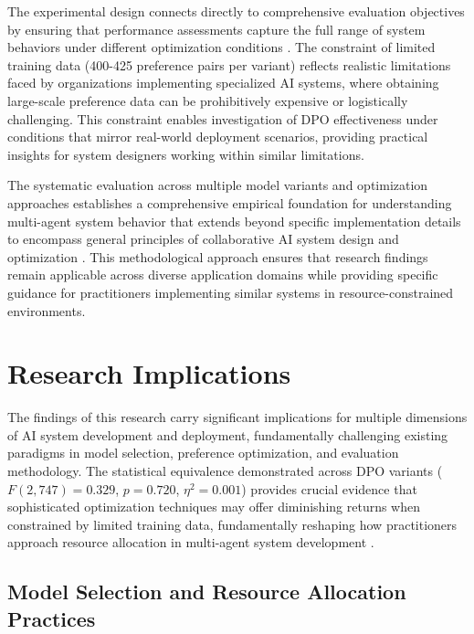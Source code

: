 The experimental design connects directly to comprehensive evaluation objectives by ensuring that performance assessments capture the full range of system behaviors under different optimization conditions \cite{card2020statistical_power, connolly2023task_specific}. The constraint of limited training data (400-425 preference pairs per variant) reflects realistic limitations faced by organizations implementing specialized AI systems, where obtaining large-scale preference data can be prohibitively expensive or logistically challenging. This constraint enables investigation of DPO effectiveness under conditions that mirror real-world deployment scenarios, providing practical insights for system designers working within similar limitations.

The systematic evaluation across multiple model variants and optimization approaches establishes a comprehensive empirical foundation for understanding multi-agent system behavior that extends beyond specific implementation details to encompass general principles of collaborative AI system design and optimization \cite{kim2025pipa_evaluation, siegel2024core_bench}. This methodological approach ensures that research findings remain applicable across diverse application domains while providing specific guidance for practitioners implementing similar systems in resource-constrained environments.

\section{Research Implications}

The findings of this research carry significant implications for multiple dimensions of AI system development and deployment, fundamentally challenging existing paradigms in model selection, preference optimization, and evaluation methodology. The statistical equivalence demonstrated across DPO variants ($F(2,747) = 0.329$, $p = 0.720$, $\eta^2 = 0.001$) provides crucial evidence that sophisticated optimization techniques may offer diminishing returns when constrained by limited training data, fundamentally reshaping how practitioners approach resource allocation in multi-agent system development \cite{deng2025preference_data_selection, feng2024dpo_limitations}.

\subsection{Model Selection and Resource Allocation Practices}

